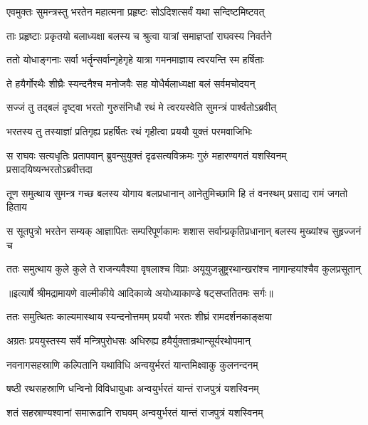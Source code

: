 \twolineshloka
{एवमुक्तः सुमन्त्रस्तु भरतेन महात्मना}
{प्रहृष्टः सोऽदिशत्सर्वं यथा सन्दिष्टमिष्टवत्} %

\twolineshloka
{ताः प्रहृष्टाः प्रकृतयो बलाध्यक्षा बलस्य च}
{श्रुत्वा यात्रां समाज्ञप्तां राघवस्य निवर्तने} %

\twolineshloka
{ततो योधाङ्गनाः सर्वा भर्तॄन्सर्वान्गृहेगृहे}
{यात्रा गमनमाज्ञाय त्वरयन्ति स्म हर्षिताः} %

\twolineshloka
{ते हयैर्गोरथैः शीघ्रैः स्यन्दनैश्च मनोजवैः}
{सह योधैर्बलाध्यक्षा बलं सर्वमचोदयन्} %

\twolineshloka
{सज्जं तु तद्बलं दृष्ट्वा भरतो गुरुसंनिधौ}
{रथं मे त्वरयस्वेति सुमन्त्रं पार्श्वतोऽब्रवीत्} %

\twolineshloka
{भरतस्य तु तस्याज्ञां प्रतिगृह्य प्रहर्षितः}
{रथं गृहीत्वा प्रययौ युक्तं परमवाजिभिः} %

\fourlineindentedshloka
{स राघवः सत्यधृतिः प्रतापवान्}
{ब्रुवन्सुयुक्तं दृढसत्यविक्रमः}
{गुरुं महारण्यगतं यशस्विनम्}
{प्रसादयिष्यन्भरतोऽब्रवीत्तदा} %

\fourlineindentedshloka
{तूण समुत्थाय सुमन्त्र गच्छ}
{बलस्य योगाय बलप्रधानान्}
{आनेतुमिच्छामि हि तं वनस्थम्}
{प्रसाद्य रामं जगतो हिताय} %

\fourlineindentedshloka
{स सूतपुत्रो भरतेन सम्यक्}
{आज्ञापितः सम्परिपूर्णकामः}
{शशास सर्वान्प्रकृतिप्रधानान्}
{बलस्य मुख्यांश्च सुहृज्जनं च} %

\fourlineindentedshloka
{ततः समुत्थाय कुले कुले ते}
{राजन्यवैश्या वृषलाश्च विप्राः}
{अयूयुजन्नुष्ट्ररथान्खरांश्च}
{नागान्हयांश्चैव कुलप्रसूतान्} %


{॥इत्यार्षे श्रीमद्रामायणे वाल्मीकीये आदिकाव्ये अयोध्याकाण्डे षट्सप्ततितमः सर्गः॥}


\twolineshloka
{ततः समुत्थितः काल्यमास्थाय स्यन्दनोत्तमम्}
{प्रययौ भरतः शीघ्रं रामदर्शनकाङ्क्षया} %

\twolineshloka
{अग्रतः प्रययुस्तस्य सर्वे मन्त्रिपुरोधसः}
{अधिरुह्य हयैर्युक्तान्रथान्सूर्यरथोपमान्} %

\twolineshloka
{नवनागसहस्राणि कल्पितानि यथाविधि}
{अन्वयुर्भरतं यान्तमिक्ष्वाकु कुलनन्दनम्} %

\twolineshloka
{षष्ठी रथसहस्राणि धन्विनो विविधायुधाः}
{अन्वयुर्भरतं यान्तं राजपुत्रं यशस्विनम्} %

\twolineshloka
{शतं सहस्राण्यश्वानां समारूढानि राघवम्}
{अन्वयुर्भरतं यान्तं राजपुत्रं यशस्विनम्} %

